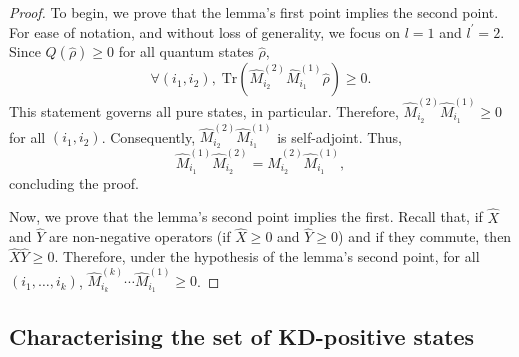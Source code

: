 \documentclass[%
 reprint,
superscriptaddress,
nofootinbib,
bibnotes,
 amsmath,amssymb,
 aps,
]{revtex4-1}
\theoremstyle{plain}
\begin{document}
\begin{proof}
To begin, we prove that the lemma's first point implies the second point.
For ease of notation, and without loss of generality, we focus on  $l=1$ and $l^{\prime}=2$. Since $Q(\hat\rho) \geqslant 0$ for all quantum states $\hat{\rho}$, 
\begin{equation}
 \forall (i_1,i_2), \;  \mathrm{Tr} \left( \hat{M}_{i_2}^{(2)}\hat{M}_{i_1}^{(1)}\hat{\rho} \right) \geqslant 0 .
\end{equation}
This statement governs 
all pure states, in particular. Therefore, $\hat{M}_{i_2}^{(2)}\hat{M}_{i_1}^{(1)} \geqslant 0$ for all $ (i_1,i_2)$. Consequently, $\hat{M}_{i_2}^{(2)}\hat{M}_{i_1}^{(1)}$ is self-adjoint. Thus,
\begin{equation}
\hat{M}_{i_1}^{(1)} \hat{M}_{i_2}^{(2)} = \hat{M}_{i_2}^{(2)} \hat{M}_{i_1}^{(1)} ,
\end{equation}
concluding the proof.



Now, we prove that the lemma's second point implies the first. Recall that, if $\hat{X}$ and $\hat{Y}$ are non-negative operators (if $\hat{X} \geqslant 0$ and $\hat{Y} \geqslant 0$) and if they commute, then $\hat{X} \hat{Y} \geqslant 0$.  Therefore, under the hypothesis of the lemma's second point, for all $(i_1, \dots, i_k)$,  $\hat{M}_{i_k}^{(k)}\cdots \hat{M}_{i_1}^{(1)} \geqslant 0$. 
 \end{proof}



\subsection{Characterising the set of KD-positive states}
\label{sec:CarKD+}
\end{document}
